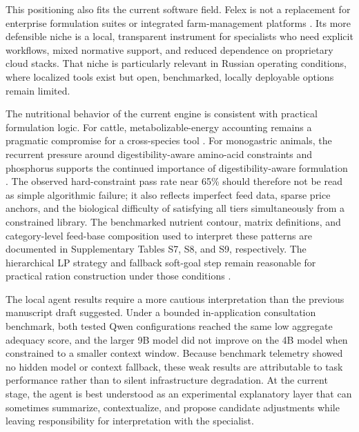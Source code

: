 \documentclass[a4paper,fleqn]{cas-sc}
\begin{document}
This positioning also fits the current software field. Felex is not a replacement for enterprise formulation suites or integrated farm-management platforms \citep{datacor2026, korall2026, onecow2026}. Its more defensible niche is a local, transparent instrument for specialists who need explicit workflows, mixed normative support, and reduced dependence on proprietary cloud stacks. That niche is particularly relevant in Russian operating conditions, where localized tools exist \citep{deltakorm2026, winmix2026} but open, benchmarked, locally deployable options remain limited.

The nutritional behavior of the current engine is consistent with practical formulation logic. For cattle, metabolizable-energy accounting remains a pragmatic compromise for a cross-species tool \citep{inra2018, volden2011, kalashnikov2003}. For monogastric animals, the recurrent pressure around digestibility-aware amino-acid constraints and phosphorus supports the continued importance of digestibility-aware formulation \citep{stein2007, nRC2012, pomar2021, deLange2012, vanmilgen2015}. The observed hard-constraint pass rate near 65\% should therefore not be read as simple algorithmic failure; it also reflects imperfect feed data, sparse price anchors, and the biological difficulty of satisfying all tiers simultaneously from a constrained library. The benchmarked nutrient contour, matrix definitions, and category-level feed-base composition used to interpret these patterns are documented in Supplementary Tables S7, S8, and S9, respectively. The hierarchical LP strategy and fallback soft-goal step remain reasonable for practical ration construction under those conditions \citep{rehman1987}.

The local agent results require a more cautious interpretation than the previous manuscript draft suggested. Under a bounded in-application consultation benchmark, both tested Qwen configurations reached the same low aggregate adequacy score, and the larger 9B model did not improve on the 4B model when constrained to a smaller context window. Because benchmark telemetry showed no hidden model or context fallback, these weak results are attributable to task performance rather than to silent infrastructure degradation. At the current stage, the agent is best understood as an experimental explanatory layer that can sometimes summarize, contextualize, and propose candidate adjustments while leaving responsibility for interpretation with the specialist.
\end{document}
